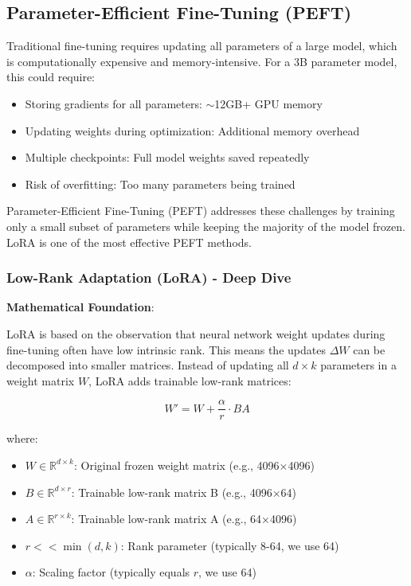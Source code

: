 \documentclass[conference]{IEEEtran}
\begin{document}
\subsection{Parameter-Efficient Fine-Tuning (PEFT)}

Traditional fine-tuning requires updating all parameters of a large model, which is computationally expensive and memory-intensive. For a 3B parameter model, this could require:
\begin{itemize}
    \item Storing gradients for all parameters: $\sim$12GB+ GPU memory
    \item Updating weights during optimization: Additional memory overhead
    \item Multiple checkpoints: Full model weights saved repeatedly
    \item Risk of overfitting: Too many parameters being trained
\end{itemize}

Parameter-Efficient Fine-Tuning (PEFT) addresses these challenges by training only a small subset of parameters while keeping the majority of the model frozen. LoRA is one of the most effective PEFT methods.

\subsubsection{Low-Rank Adaptation (LoRA) - Deep Dive}

\textbf{Mathematical Foundation}:

LoRA is based on the observation that neural network weight updates during fine-tuning often have low intrinsic rank. This means the updates $\Delta W$ can be decomposed into smaller matrices. Instead of updating all $d \times k$ parameters in a weight matrix $W$, LoRA adds trainable low-rank matrices:

\begin{equation}
W' = W + \frac{\alpha}{r} \cdot BA
\end{equation}

where:
\begin{itemize}
    \item $W \in \mathbb{R}^{d \times k}$: Original frozen weight matrix (e.g., 4096×4096)
    \item $B \in \mathbb{R}^{d \times r}$: Trainable low-rank matrix B (e.g., 4096×64)
    \item $A \in \mathbb{R}^{r \times k}$: Trainable low-rank matrix A (e.g., 64×4096)
    \item $r << \min(d, k)$: Rank parameter (typically 8-64, we use 64)
    \item $\alpha$: Scaling factor (typically equals $r$, we use 64)
\end{itemize}
\end{document}
